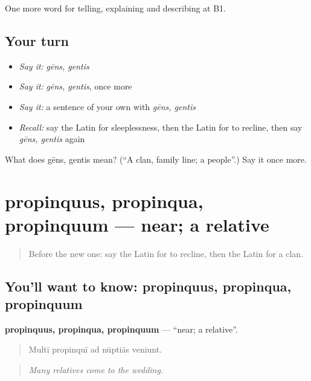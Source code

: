 \begin{grammarlens}[title={What you've built}]
One more word for telling, explaining and describing at B1.
\end{grammarlens}

\subsection*{Your turn}
\begin{itemize}
\raggedright
  \item \emph{Say it:} \emph{gēns, gentis}
  \item \emph{Say it:} \emph{gēns, gentis}, once more
  \item \emph{Say it:} a sentence of your own with \emph{gēns, gentis}
  \item \emph{Recall:} say the Latin for sleeplessness, then the Latin for to recline, then say \emph{gēns, gentis} again
\end{itemize}

\begin{tcolorbox}[breakable,colback=teal!4,colframe=teal!35!black,title={Before you move on}]
What does gēns, gentis mean? (\textquotedblleft{}A clan, family line; a people\textquotedblright{}.) Say it once more.
\end{tcolorbox}
\section[propinquus, propinqua, propinquum]{propinquus, propinqua, propinquum — near; a relative}

\label{lesson:LA-C528-propinquus}



\begin{quote}
Before the new one: say the Latin for to recline, then the Latin for a clan.
\end{quote}

\subsection*{You'll want to know: propinquus, propinqua, propinquum}
\textbf{propinquus, propinqua, propinquum} — \textquotedblleft{}near; a relative\textquotedblright{}.

\begin{quote}
Multī propinquī ad nūptiās veniunt.
\end{quote}

\begin{quote}
\emph{Many relatives come to the wedding.}
\end{quote}

